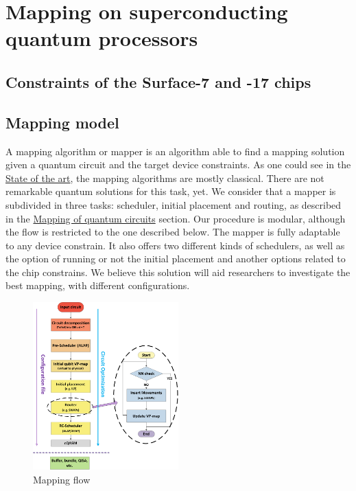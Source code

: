 
\chapter*{Mapping on superconducting quantum processors}
\label{sec:orgf832208}
\section*{Constraints of the Surface-7 and -17 chips}
\label{sec:orgc117dae}


\section*{Mapping model}
\label{sec:org92c4a38}
A mapping algorithm or mapper is an algorithm able to find a mapping solution given a quantum circuit and the target device constraints.
As one could see in the \href{chapter-2.org}{State of the art}, the mapping algorithms are mostly classical.
There are not remarkable quantum solutions for this task, yet.
We consider that a mapper is subdivided in three tasks: scheduler, initial placement and routing, as described in the \href{chapter-2.org}{Mapping of quantum circuits} section.
Our procedure is modular, although the flow is restricted to the one described below.
The mapper is fully adaptable to any device constrain.
It also offers two different kinds of schedulers, as well as the option of running or not the initial placement and another options related to the chip constrains.
We believe this solution will aid researchers to investigate the best mapping, with different configurations.

\begin{figure}[htbp]
\centering
\includegraphics[width=0.5\textwidth]{figures/mapping_flow2.png}
\caption{\label{fig:org01180fd}
Mapping flow}
\end{figure}


